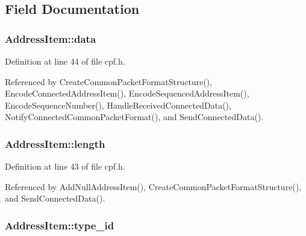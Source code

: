 \subsection{\-Field \-Documentation}
\hypertarget{structAddressItem_ae405cdded64b36b5bbad607ea251865a}{
\subsubsection[{data}]{ {\bf \-Address\-Item\-::data}}}\label{d3/d56/structAddressItem_ae405cdded64b36b5bbad607ea251865a}


\-Definition at line 44 of file cpf.\-h.



\-Referenced by \-Create\-Common\-Packet\-Format\-Structure(), \-Encode\-Connected\-Address\-Item(), \-Encode\-Sequenced\-Address\-Item(), \-Encode\-Sequence\-Number(), \-Handle\-Received\-Connected\-Data(), \-Notify\-Connected\-Common\-Packet\-Format(), and \-Send\-Connected\-Data().

\hypertarget{structAddressItem_a8651f8610143cd0ef830abdc1fcf00b2}{
\subsubsection[{length}]{ {\bf \-Address\-Item\-::length}}}\label{d3/d56/structAddressItem_a8651f8610143cd0ef830abdc1fcf00b2}


\-Definition at line 43 of file cpf.\-h.



\-Referenced by \-Add\-Null\-Address\-Item(), \-Create\-Common\-Packet\-Format\-Structure(), and \-Send\-Connected\-Data().

\hypertarget{structAddressItem_a9b3cf54385b7e3db0c41d4d394c2d465}{
\subsubsection[{type\-\_\-id}]{ {\bf \-Address\-Item\-::type\-\_\-id}}}\label{d3/d56/structAddressItem_a9b3cf54385b7e3db0c41d4d394c2d465}


